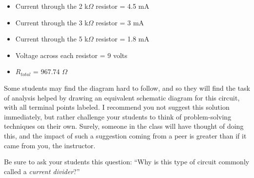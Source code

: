 
\begin{itemize}
\item{} Current through the 2 k$\Omega$ resistor = 4.5 mA
\item{} Current through the 3 k$\Omega$ resistor = 3 mA
\item{} Current through the 5 k$\Omega$ resistor = 1.8 mA
\item{} Voltage across each resistor = 9 volts
\item{} $R_{total}$ = 967.74 $\Omega$
\end{itemize}







Some students may find the diagram hard to follow, and so they will find the task of analysis helped by drawing an equivalent schematic diagram for this circuit, with all terminal points labeled.  I recommend you not suggest this solution immediately, but rather challenge your students to think of problem-solving techniques on their own.  Surely, someone in the class will have thought of doing this, and the impact of such a suggestion coming from a peer is greater than if it came from you, the instructor.

Be sure to ask your students this question: ``Why is this type of circuit commonly called a {\it current divider}?''




